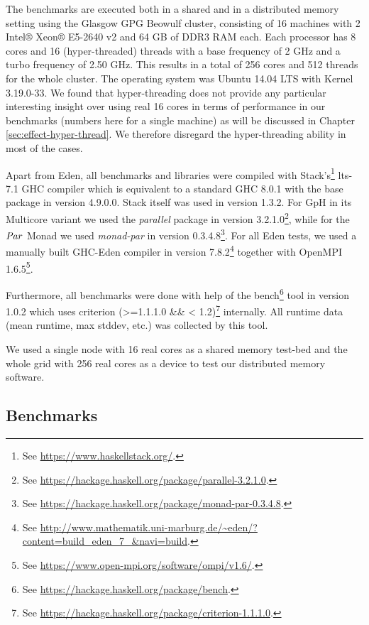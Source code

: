 \documentclass[paper=A4,twoside=true,openright,parskip=full,chapterprefix=true,headings=normal,bibliography=totoc,listof=totoc,titlepage=on,captions=tableabove,draft=false,british]{scrreprt}%
\begin{document}
\label{sec:hardwareSoftware}

The benchmarks are executed both in a shared and in a distributed memory
setting using the Glasgow GPG Beowulf cluster, consisting of 16 machines
with 2 Intel® Xeon® E5-2640 v2 and 64 GB of DDR3 RAM each. Each
processor has 8 cores and 16 (hyper-threaded) threads with a base
frequency of 2 GHz and a turbo frequency of 2.50 GHz. This results in a
total of 256 cores and 512 threads for the whole cluster. The operating
system was Ubuntu 14.04 LTS with Kernel 3.19.0-33. We found that
hyper-threading does not provide any particular interesting insight over
using real 16 cores in terms of performance in our benchmarks (numbers
here for a single machine) as will be discussed in Chapter
\ref{sec:effect-hyper-thread}. We therefore disregard the
hyper-threading ability in most of the cases.

Apart from Eden, all benchmarks and libraries were compiled with
Stack's\footnote{See \url{https://www.haskellstack.org/}.} lts-7.1 GHC
compiler which is equivalent to a standard GHC 8.0.1 with the base
package in version 4.9.0.0. Stack itself was used in version 1.3.2. For
GpH in its Multicore variant we used the \emph{parallel} package in
version 3.2.1.0\footnote{See
  \url{https://hackage.haskell.org/package/parallel-3.2.1.0}.}, while for
the \ensuremath{\Conid{Par}} Monad we used \emph{monad-par} in version 0.3.4.8\footnote{See
  \url{https://hackage.haskell.org/package/monad-par-0.3.4.8}.}. For all
Eden tests, we used a manually built GHC-Eden compiler in version
7.8.2\footnote{See
  \url{http://www.mathematik.uni-marburg.de/~eden/?content=build_eden_7_&navi=build}.}
together with OpenMPI 1.6.5\footnote{See
  \url{https://www.open-mpi.org/software/ompi/v1.6/}.}.

Furthermore, all benchmarks were done with help of the bench\footnote{See
  \url{https://hackage.haskell.org/package/bench}.} tool in version 1.0.2
which uses criterion (\textgreater{}=1.1.1.0 \&\& \textless{}
1.2)\footnote{See
  \url{https://hackage.haskell.org/package/criterion-1.1.1.0}.}
internally. All runtime data (mean runtime, max stddev, etc.) was
collected by this tool.

We used a single node with 16 real cores as a shared memory test-bed and
the whole grid with 256 real cores as a device to test our distributed
memory software.

\hypertarget{benchmarks}{%
\subsection{Benchmarks}\label{benchmarks}}
\end{document}
